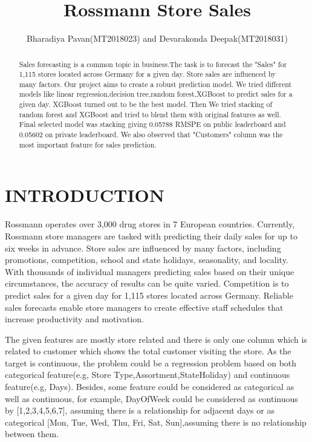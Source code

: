 \documentclass[letterpaper, 10 pt, conference]{ieeeconf}  %
\title{\LARGE \bf
Rossmann Store Sales
}
\author{Bharadiya Pavan(MT2018023) and Devarakonda Deepak(MT2018031)%
}
\begin{document}
\maketitle
\thispagestyle{empty}
\pagestyle{empty}


\begin{abstract}

Sales forecasting is a common topic in business.The task is to forecast the "Sales" for 1,115 stores located across Germany
for a given day. Store sales are influenced by many factors. Our project aims to create a robust prediction model.
We tried different models like linear regression,decision tree,random forest,XGBoost to predict sales for a given day. XGBoost turned out to be the best model. Then We tried stacking of random forest and XGBoost and tried to blend them with original features as well. Final selected model was stacking giving 0.05788 RMSPE on public leaderboard and 0.05602 on private leaderboard. We also observed that "Customers" column was the most important feature for sales prediction.   

\end{abstract}


\section{INTRODUCTION}

Rossmann operates over 3,000 drug stores in 7 European countries. Currently, Rossmann store managers are tasked with predicting their daily sales for up to six weeks in advance. Store sales are influenced by many factors, including promotions, competition, school and state holidays, seasonality, and locality. With thousands of individual managers predicting sales based on their unique circumstances, the accuracy of results can be quite varied. Competition is to predict sales for a given day for 1,115 stores located across Germany. Reliable sales forecasts enable store managers to create effective staff schedules that increase productivity and motivation. 

The given features are mostly store related and there is only one column which is related to customer which shows the total customer visiting the store. As the target is continuous, the problem could be a regression problem based on both categorical feature(e.g,  Store Type,Assortment,StateHoliday) and continuous feature(e.g, Days). Besides, some feature could be considered as categorical as well as continuous,  for example,  DayOfWeek could be considered as continuous by
[1,2,3,4,5,6,7], assuming there is a relationship for adjacent days or as categorical [Mon, Tue, Wed, Thu, Fri, Sat, Sun],assuming there is no relationship between them.
\end{document}
